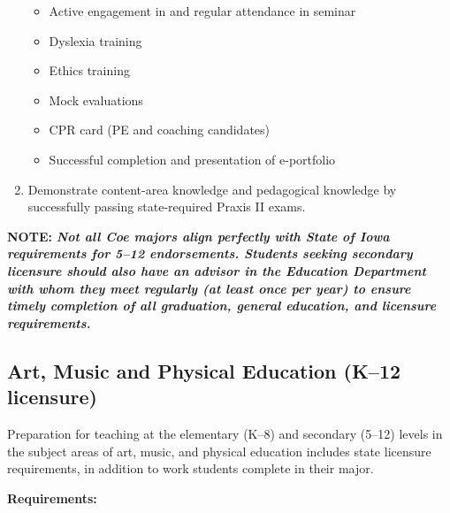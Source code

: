 \documentclass[
  letterpaper,
]{scrbook}
\providecommand{\tightlist}{%
  \setlength{\itemsep}{0pt}\setlength{\parskip}{0pt}}
\begin{document}
\begin{enumerate}
  \begin{itemize}
  \tightlist
  \item
    Active engagement in and regular attendance in seminar
  \item
    Dyslexia training
  \item
    Ethics training
  \item
    Mock evaluations
  \item
    CPR card (PE and coaching candidates)
  \item
    Successful completion and presentation of e-portfolio
  \end{itemize}
\item
  Demonstrate content-area knowledge and pedagogical knowledge by
  successfully passing state-required Praxis II exams.
\end{enumerate}

\textbf{NOTE:} \textbf{\emph{Not all Coe majors align perfectly with
State of Iowa requirements for 5--12 endorsements. Students seeking
secondary licensure should also have an advisor in the Education
Department with whom they meet regularly (at least once per year) to
ensure timely completion of all graduation, general education, and
licensure requirements.}}

\subsection{Art, Music and Physical Education (K--12
licensure)}\label{art-music-and-physical-education-k12-licensure}

Preparation for teaching at the elementary (K--8) and secondary (5--12)
levels in the subject areas of art, music, and physical education
includes state licensure requirements, in addition to work students
complete in their major.

\textbf{Requirements:}
\end{document}

